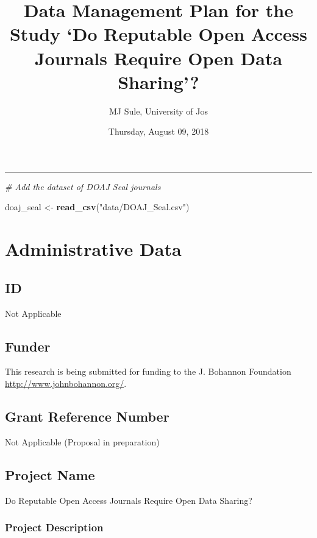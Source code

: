 \documentclass[]{article}
\title{Data Management Plan for the Study `Do Reputable Open Access Journals
Require Open Data Sharing'?}
\author{MJ Sule, University of Jos}
\date{Thursday, August 09, 2018}
\newenvironment{Shaded}{\begin{snugshade}}{\end{snugshade}}
\newcommand{\KeywordTok}[1]{\textcolor[rgb]{0.13,0.29,0.53}{\textbf{#1}}}
\newcommand{\StringTok}[1]{\textcolor[rgb]{0.31,0.60,0.02}{#1}}
\newcommand{\CommentTok}[1]{\textcolor[rgb]{0.56,0.35,0.01}{\textit{#1}}}
\newcommand{\NormalTok}[1]{#1}
\begin{document}
\maketitle

\begin{center}\rule{0.5\linewidth}{\linethickness}\end{center}

\begin{Shaded}
\begin{Highlighting}[]
\CommentTok{# Add the dataset of DOAJ Seal journals}

\NormalTok{doaj_seal <-}\StringTok{ }\KeywordTok{read_csv}\NormalTok{(}\StringTok{"data/DOAJ_Seal.csv"}\NormalTok{)}
\end{Highlighting}
\end{Shaded}

\section{Administrative Data}\label{administrative-data}

\subsection{ID}\label{id}

Not Applicable

\subsection{Funder}\label{funder}

This research is being submitted for funding to the J. Bohannon
Foundation \url{http://www.johnbohannon.org/}.

\subsection{Grant Reference Number}\label{grant-reference-number}

Not Applicable (Proposal in preparation)

\subsection{Project Name}\label{project-name}

Do Reputable Open Access Journals Require Open Data Sharing?

\subsubsection{Project Description}\label{project-description}
\end{document}

